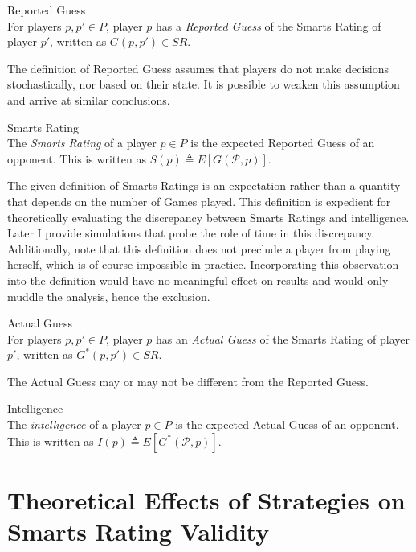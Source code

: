 \theoremstyle{definition}
\begin{definition}{Reported Guess}\\
For players $p, p' \in P$, player $p$ has a \textit{Reported Guess} of the Smarts Rating of player $p'$, written as $G(p, p') \in SR$.
\end{definition}

\noindent The definition of Reported Guess assumes that players do not make decisions stochastically, nor based on their state. It is possible to weaken this assumption and arrive at similar conclusions.

\theoremstyle{definition}
\begin{definition}{Smarts Rating}\\
The \textit{Smarts Rating} of a player $p \in P$ is the expected Reported Guess of an opponent. This is written as $S(p) \triangleq E[G(\mathcal{P}, p)]$.
\end{definition}

\noindent The given definition of Smarts Ratings is an expectation rather than a quantity that depends on the number of Games played. This definition is expedient for theoretically evaluating the discrepancy between Smarts Ratings and intelligence. Later I provide simulations that probe the role of time in this discrepancy. Additionally, note that this definition does not preclude a player from playing herself, which is of course impossible in practice. Incorporating this observation into the definition would have no meaningful effect on results and would only muddle the analysis, hence the exclusion.

\theoremstyle{definition}
\begin{definition}{Actual Guess}\\
For players $p, p' \in P$, player $p$ has an \textit{Actual Guess} of the Smarts Rating of player $p'$, written as $G^*(p, p') \in SR$.
\end{definition}

\noindent The Actual Guess may or may not be different from the Reported Guess.

\theoremstyle{definition}
\begin{definition}{Intelligence}\\
The \textit{intelligence} of a player $p \in P$ is the expected Actual Guess of an opponent. This is written as $I(p) \triangleq E[G^*(\mathcal{P}, p)]$.
\end{definition}

\section{Theoretical Effects of Strategies on Smarts Rating Validity}


